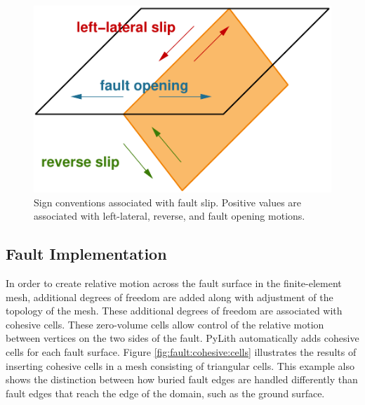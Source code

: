 \noindent \begin{center}
\begin{figure}[H]
\begin{centering}
\includegraphics{boundaryconditions/figs/slipmotions}
\par\end{centering}

\caption{Sign conventions associated with fault slip. Positive values are associated
with left-lateral, reverse, and fault opening motions.\label{fig:fault:slip:motions} }
\end{figure}

\par\end{center}


\subsection{Fault Implementation}

In order to create relative motion across the fault surface in the
finite-element mesh, additional degrees of freedom are added along
with adjustment of the topology of the mesh. These additional degrees
of freedom are associated with cohesive cells. These zero-volume cells
allow control of the relative motion between vertices on the two sides
of the fault. PyLith automatically adds cohesive cells for each fault
surface. Figure \ref{fig:fault:cohesive:cells} illustrates the results
of inserting cohesive cells in a mesh consisting of triangular cells.
This example also shows the distinction between how buried fault edges
are handled differently than fault edges that reach the edge of the
domain, such as the ground surface.

